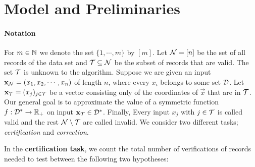 \section{Model and Preliminaries}
\label{sec:prelim}


\paragraph{Notation} For $m \in \nats$ we denote the set $\{1,\cdots,m\}$ by $[m]$. %
Let $\Workers = [n]$ be the set of all records of the data set and $\Truth\subseteq \Workers$ be the subset of records
that are valid. The set $\Truth$ is unknown to the algorithm. Suppose we are given an input $\xw = (x_1, x_2 , \cdots , x_n)$ 
of length $n$, where every $x_i$ belongs to some set $\Domain$. Let $\vec{x}_{\cal T} = (x_j)_{j\in {\cal T}}$ be a vector 
consisting only of the coordinates of $\vec{x}$ that are in $\Truth$. Our general goal is to approximate the value of a 
symmetric function $f : \Domain^* \rightarrow \mathbb{R}_+$ on input $\vec x_\Truth \in \Domain^*$. Finally, Every input $x_j$
with $j \in \Truth$
is called valid and the rest $\Workers \setminus \Truth$ are called invalid. We consider two different tasks; \emph{certification}
and \emph{correction}.

\smallskip
\noindent In the {\bf certification task}, we count the total number of verifications of records needed to test between
the following two hypotheses:

